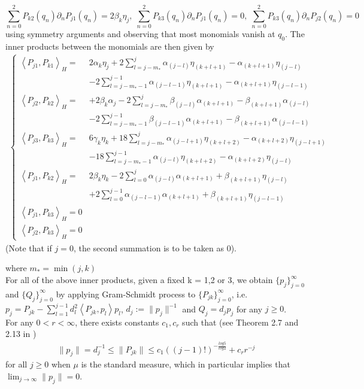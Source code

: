 \documentclass[12pt]{amsart}
\theoremstyle{plain}
\theoremstyle{definition}
\newcommand{\inner}[2]{\left \langle #1, #2\right \rangle}
\begin{document}
   $$ \sum_{n = 0}^2 P_{k2}(q_n)\partial_nP_{j1}(q_n) = 2\beta_k\eta_j,\;
    \sum_{n = 0}^2 P_{k3}(q_n)\partial_nP_{j1}(q_n) = 0,\;
    \sum_{n = 0}^2 P_{k3}(q_n)\partial_nP_{j2}(q_n) = 0
$$
using symmetry arguments and observing that most monomials vanish at $q_0$.
The inner products between the monomials are then given by
\begin{align}
    \begin{cases}
    \inner{P_{j1}}{P_{k1}}_H =  &2\alpha_k\eta_j + 2\sum\limits_{l=j-m_*}^j \alpha_{(j-l)}\eta_{(k+l+1)} - \alpha_{(k+l+1)}\eta_{(j-l)} \\[20pt]&- 2\sum\limits_{l=j-m_*-1}^{j-1} \alpha_{(j-l-1)}\eta_{(k+l+1)} - \alpha_{(k+l+1)}\eta_{(j-l-1)} \\[20pt]
    \inner{P_{j2}}{P_{k2}}_H = &+ 2\beta_k\alpha_j -2\sum\limits_{l=j-m_*}^j \beta_{(j-l)}\alpha_{(k+l+1)} - \beta_{(k+l+1)}\alpha_{(j-l)} \\[20pt]&- 2\sum\limits_{l=j-m_*-1}^{j-1} \beta_{(j-l-1)}\alpha_{(k+l+1)} - \beta_{(k+l+1)}\alpha_{(j-l-1)} \\[20pt]
    \inner{P_{j3}}{P_{k3}}_H =  &6\gamma_k\eta_k + 18\sum\limits_{l=j-m_*}^j \alpha_{(j-l+1)}\eta_{(k+l+2)} - \alpha_{(k+l+2)}\eta_{(j-l+1)} \\[20pt]&- 18\sum\limits_{l=j-m_*-1}^{j-1} \alpha_{(j-l)}\eta_{(k+l+2)} - \alpha_{(k+l+2)}\eta_{(j-l)} \\[20pt]
    \inner{P_{j1}}{P_{k2}}_H = &2\beta_k\eta_k -2\sum\limits_{l=0}^j \alpha_{(j-l)}\alpha_{(k+l+1)} + \beta_{(k+l+1)}\eta_{(j-l)} \\[20pt]&+2 \sum\limits_{l=0}^{j-1} \alpha_{(j-l-1)}\alpha_{(k+l+1)} + \beta_{(k+l+1)}\eta_{(j-l-1)} \\[20pt]
    \inner{P_{j1}}{P_{k3}}_H = 0\\
    \inner{P_{j2}}{P_{k3}}_H = 0
    \end{cases}
\end{align}
(Note that if $j = 0$, the second summation is to be taken as 0).

where $m_* = \min(j,k)$\\
For all of the above inner products, given a fixed k = 1,2 or 3, we obtain $\{p_{j}\}_{j=0}^\infty$ and $\{Q_{j}\}_{j=0}^\infty$ by applying Gram-Schmidt process to $\{P_{jk}\}_{j=0}^\infty$, i.e. $p_j=P_{jk}-\sum\limits_{l=1}^{j-1}d_l^2\inner{P_{jk}}{p_l}p_l$, $d_j:=\|p_j\|^{-1}$ and $Q_j=d_jp_j$ for any $j \geq 0$. \\
For any $0 < r <\infty$, there exists constants $c_1, c_r$ such that (see Theorem 2.7 and 2.13 in \cite{NSTY}) 
\begin{gather}
   \|p_j\|= d_j^{-1}\leq\|P_{jk}\|\le c_1((j-1)!)^{-\frac{log5}{log2}}+c_rr^{-j}
\end{gather}
for all $j \geq 0$ when $\mu$ is the standard measure, which in particular implies that $\lim_{j\to \infty}\|p_j\|=0$.\\
\end{document}
